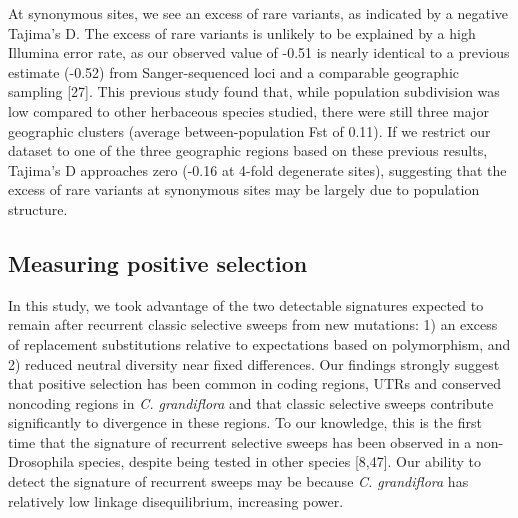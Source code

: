 At synonymous sites, we see an excess of rare variants, as indicated by a negative Tajima’s D. The excess of rare variants is unlikely to be explained by a high Illumina error rate, as our observed value of -0.51 is nearly identical to a previous estimate (-0.52) from Sanger-sequenced loci and a comparable geographic sampling [27]. This previous study found that, while population subdivision was low compared to other herbaceous species studied, there were still three major geographic clusters (average between-population Fst of 0.11). If we restrict our dataset to one of the three geographic regions based on these previous results, Tajima’s D approaches zero (-0.16 at 4-fold degenerate sites), suggesting that the excess of rare variants at synonymous sites may be largely due to population structure. 

\subsection{Measuring positive selection}
	In this study, we took advantage of the two detectable signatures expected to remain after recurrent classic selective sweeps from new mutations: 1) an excess of replacement substitutions relative to expectations based on polymorphism, and 2) reduced neutral diversity near fixed differences. Our findings strongly suggest that positive selection has been common in coding regions, UTRs and conserved noncoding regions in \textit{C. grandiflora} and that classic selective sweeps contribute significantly to divergence in these regions. To our knowledge, this is the first time that the signature of recurrent selective sweeps has been observed in a non-Drosophila species, despite being tested in other species [8,47]. Our ability to detect the signature of recurrent sweeps may be because \textit{C. grandiflora} has relatively low linkage disequilibrium, increasing power.

